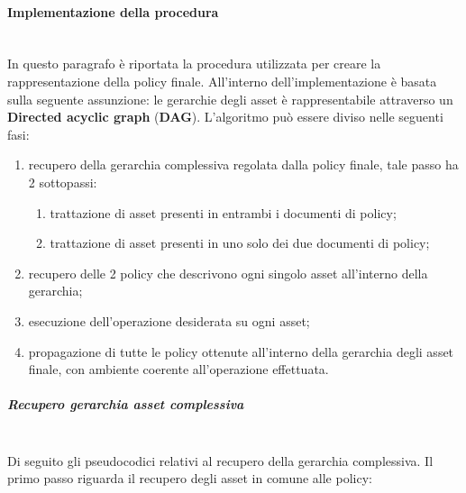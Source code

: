 \documentclass[12pt,a4paper,twoside]{book}
\begin{document}
\paragraph{Implementazione della procedura}\mbox{}\\
In questo paragrafo è riportata la procedura utilizzata per creare la rappresentazione della policy finale. All'interno dell'implementazione è basata sulla seguente assunzione: le gerarchie degli asset è rappresentabile attraverso un \textbf{Directed acyclic graph} (\textbf{DAG}).
L'algoritmo può essere diviso nelle seguenti fasi:
\begin{enumerate}
	\item recupero della gerarchia complessiva regolata dalla policy finale, tale passo ha 2 sottopassi:
	\begin{enumerate}
		\item trattazione di asset presenti in entrambi i documenti di policy;
		\item trattazione di asset presenti in uno solo dei due documenti di policy;
	\end{enumerate}
	\item recupero delle 2 policy che descrivono ogni singolo asset all'interno della gerarchia;
	\item esecuzione dell'operazione desiderata su ogni asset;
	\item propagazione di tutte le policy ottenute all'interno della gerarchia degli asset finale, con ambiente coerente all'operazione effettuata.
\end{enumerate}
\subparagraph{Recupero gerarchia asset complessiva}\mbox{}\\
Di seguito gli pseudocodici relativi al recupero della gerarchia complessiva. Il primo passo riguarda il recupero degli asset in comune alle policy:
\end{document}
